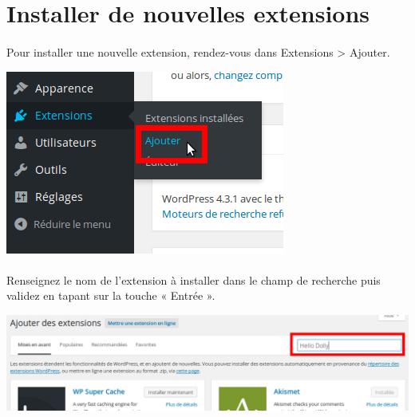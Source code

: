 \documentclass[10pt,a4paper]{article}
\begin{document}
\section{Installer de nouvelles extensions}
\paragraph{}Pour installer une nouvelle extension, rendez-vous dans Extensions > Ajouter.
\begin{center}
\includegraphics[scale=0.3]{img/0170.png}
\end{center}
\paragraph{}Renseignez le nom de l'extension à installer dans le champ de recherche puis validez en tapant sur la touche « Entrée ».
\begin{center}
\includegraphics[scale=0.3]{img/0171.png}
\end{center}
\end{document}

